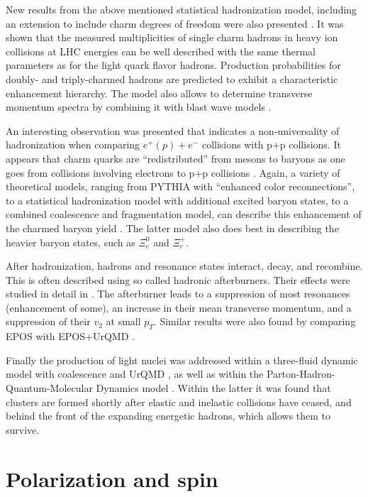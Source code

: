 \documentclass{webofc}
\begin{document}
New results from the above mentioned statistical hadronization model, including an extension to include charm degrees of freedom were also presented \cite{Andronic:2021erx}. It was shown that the measured multiplicities of single charm hadrons in heavy ion collisions at LHC energies can be well described with the same thermal parameters as for the light quark flavor hadrons. Production probabilities for doubly- and triply-charmed hadrons are predicted to exhibit a characteristic  enhancement hierarchy. The model also allows to determine transverse momentum spectra by combining it with blast wave models \cite{Andronic:2021erx,Harabasz:2020sei}.

An interesting observation was presented that indicates a non-universality of hadronization when comparing $e^+(p)+e^-$ collisions with p+p collisions. It appears that charm quarks are ``redistributed'' from mesons to baryons as one goes from collisions involving electrons to p+p collisions \cite{ALICE:2021dhb}. Again, a variety of theoretical models, ranging from PYTHIA with ``enhanced color reconnections'', to a statistical hadronization model with additional excited baryon states, to a combined coalescence and fragmentation model, can describe this enhancement of the charmed baryon yield \cite{ALICE:2020wfu}. The latter model also does best in describing the heavier baryon states, such as $\Xi_c^0$ and $\Xi_c^+$.

After hadronization, hadrons and resonance states interact, decay, and recombine. This is often described using so called hadronic afterburners. Their effects were studied in detail in \cite{Oliinychenko:2021enj}. The afterburner leads to a suppression of most resonances (enhancement of some), an increase in their mean transverse momentum, and a suppression of their $v_2$ at small $p_T$. Similar results were also found by comparing EPOS with EPOS+UrQMD \cite{Kiselev:2020ktr,Knospe:2015nva}. 

Finally the production of light nuclei was addressed within a three-fluid dynamic model with coalescence and UrQMD \cite{Kozhevnikova:2020bdb}, as well as within the Parton-Hadron-Quantum-Molecular Dynamics model \cite{Glassel:2021rod}. Within the latter it was found that clusters are formed shortly after elastic and inelastic collisions have ceased, and behind the front of the expanding energetic hadrons, which allows them to survive. 


\section{Polarization and spin}
\label{sec-spin}
\end{document}
